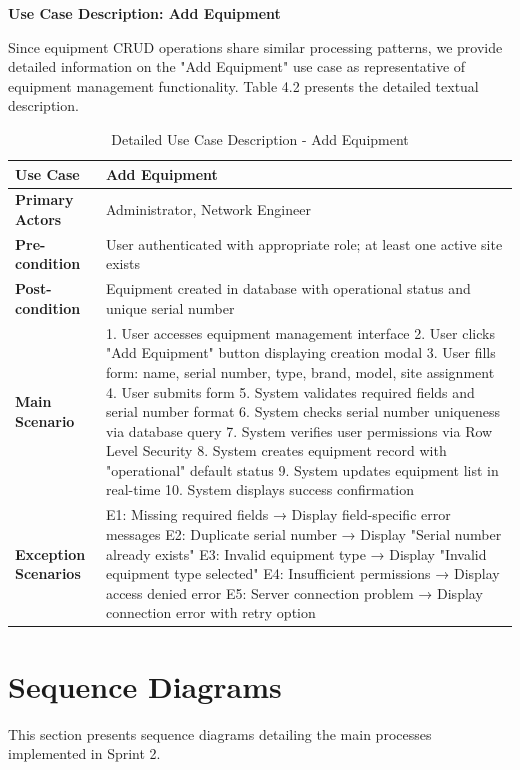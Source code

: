 \textbf{Use Case Description: Add Equipment}

Since equipment CRUD operations share similar processing patterns, we provide detailed information on the "Add Equipment" use case as representative of equipment management functionality. Table 4.2 presents the detailed textual description.

\begin{table}[H]
\centering
\small
\begin{tabular}{|p{3cm}|p{8.5cm}|}
\hline
\textbf{Use Case} & Add Equipment \\
\hline
\textbf{Primary Actors} & Administrator, Network Engineer \\
\hline
\textbf{Pre-condition} & User authenticated with appropriate role; at least one active site exists \\
\hline
\textbf{Post-condition} & Equipment created in database with operational status and unique serial number \\
\hline
\textbf{Main Scenario} & 
1. User accesses equipment management interface
2. User clicks "Add Equipment" button displaying creation modal
3. User fills form: name, serial number, type, brand, model, site assignment
4. User submits form
5. System validates required fields and serial number format
6. System checks serial number uniqueness via database query
7. System verifies user permissions via Row Level Security
8. System creates equipment record with "operational" default status
9. System updates equipment list in real-time
10. System displays success confirmation
\\
\hline
\textbf{Exception Scenarios} & 
E1: Missing required fields → Display field-specific error messages
E2: Duplicate serial number → Display "Serial number already exists"
E3: Invalid equipment type → Display "Invalid equipment type selected"
E4: Insufficient permissions → Display access denied error
E5: Server connection problem → Display connection error with retry option
\\
\hline
\end{tabular}
\caption{Detailed Use Case Description - Add Equipment}
\label{tab:add_equipment_usecase}
\end{table}

\section{Sequence Diagrams}

This section presents sequence diagrams detailing the main processes implemented in Sprint 2.

